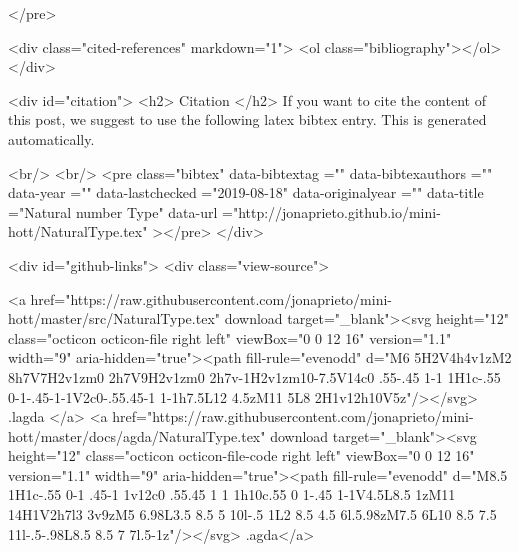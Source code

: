 </pre>


  <div class="cited-references" markdown="1">
  <ol class="bibliography"></ol>
  </div>


  
  <div id="citation">
  <h2> Citation </h2>
  If you want to cite the content of this post,
  we suggest to use the following latex bibtex entry.
  This is generated automatically.

  <br/>
  <br/>
  <pre class="bibtex"
       data-bibtextag =""
       data-bibtexauthors =""
       data-year =""
       data-lastchecked ="2019-08-18"
       data-originalyear =""
       data-title ="Natural number Type"
       data-url ="http://jonaprieto.github.io/mini-hott/NaturalType.tex"
  ></pre>
  </div>
  

  <div id="github-links">
    <div class="view-source">
      
        <a href="https://raw.githubusercontent.com/jonaprieto/mini-hott/master/src/NaturalType.tex" download target="_blank"><svg height="12" class="octicon octicon-file right left" viewBox="0 0 12 16" version="1.1" width="9" aria-hidden="true"><path fill-rule="evenodd" d="M6 5H2V4h4v1zM2 8h7V7H2v1zm0 2h7V9H2v1zm0 2h7v-1H2v1zm10-7.5V14c0 .55-.45 1-1 1H1c-.55 0-1-.45-1-1V2c0-.55.45-1 1-1h7.5L12 4.5zM11 5L8 2H1v12h10V5z"/></svg> .lagda </a>
        <a href="https://raw.githubusercontent.com/jonaprieto/mini-hott/master/docs/agda/NaturalType.tex" download target="_blank"><svg height="12" class="octicon octicon-file-code right left" viewBox="0 0 12 16" version="1.1" width="9" aria-hidden="true"><path fill-rule="evenodd" d="M8.5 1H1c-.55 0-1 .45-1 1v12c0 .55.45 1 1 1h10c.55 0 1-.45 1-1V4.5L8.5 1zM11 14H1V2h7l3 3v9zM5 6.98L3.5 8.5 5 10l-.5 1L2 8.5 4.5 6l.5.98zM7.5 6L10 8.5 7.5 11l-.5-.98L8.5 8.5 7 7l.5-1z"/></svg> .agda</a>
      
